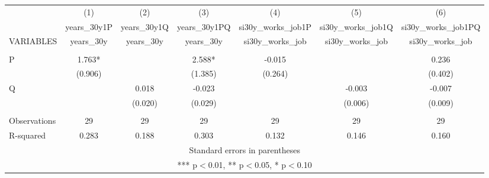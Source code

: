 \begin{tabular}{lcccccc} \hline
 & (1) & (2) & (3) & (4) & (5) & (6) \\
 & years\_30y1P & years\_30y1Q & years\_30y1PQ & si30y\_works\_job1P & si30y\_works\_job1Q & si30y\_works\_job1PQ \\
VARIABLES & years\_30y & years\_30y & years\_30y & si30y\_works\_job & si30y\_works\_job & si30y\_works\_job \\ \hline
 &  &  &  &  &  &  \\
P & 1.763* &  & 2.588* & -0.015 &  & 0.236 \\
 & (0.906) &  & (1.385) & (0.264) &  & (0.402) \\
Q &  & 0.018 & -0.023 &  & -0.003 & -0.007 \\
 &  & (0.020) & (0.029) &  & (0.006) & (0.009) \\
 &  &  &  &  &  &  \\
Observations & 29 & 29 & 29 & 29 & 29 & 29 \\
 R-squared & 0.283 & 0.188 & 0.303 & 0.132 & 0.146 & 0.160 \\ \hline
\multicolumn{7}{c}{ Standard errors in parentheses} \\
\multicolumn{7}{c}{ *** p$<$0.01, ** p$<$0.05, * p$<$0.10} \\
\end{tabular}
